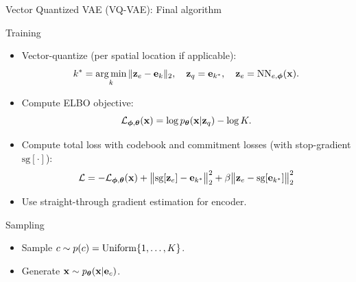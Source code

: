 \documentclass{beamer}
\begin{document}
\begin{frame}{Vector Quantized VAE (VQ-VAE): Final algorithm}
	\begin{block}{Training}
		\begin{itemize}
			\item Vector-quantize (per spatial location if applicable):
			\vspace{-0.3cm}
			\[
				k^* = \operatorname*{arg\,min}_k \|\mathbf{z}_e - \mathbf{e}_k\|_2, \quad \mathbf{z}_q = \mathbf{e}_{k^*}, \quad \mathbf{z}_e = \mathrm{NN}_{e,\boldsymbol{\phi}}(\mathbf{x}).
			\]
			\vspace{-0.5cm}
			\item Compute ELBO objective:
			\vspace{-0.3cm}
			\[
				\mathcal{L}_{\boldsymbol{\phi}, \boldsymbol{\theta}}(\mathbf{x}) = \log p_{\boldsymbol{\theta}}(\mathbf{x} | \mathbf{z}_q) - \log K.
			\]
			\vspace{-0.5cm}
			\item Compute total loss with codebook and commitment losses (with stop-gradient $\text{sg}[\cdot]$):
			\vspace{-0.3cm}
			\[
				\mathcal{L} = - \mathcal{L}_{\boldsymbol{\phi}, \boldsymbol{\theta}}(\mathbf{x}) + \big\|\text{sg}[\mathbf{z}_e] - \mathbf{e}_{k^*}\big\|_2^2 + \beta \big\|\mathbf{z}_e - \text{sg}[\mathbf{e}_{k^*}]\big\|_2^2
			\]
			\vspace{-0.5cm}
			\item Use straight-through gradient estimation for encoder.
		\end{itemize}
	\end{block}
	\eqpause
	\vspace{-0.3cm}
	\begin{block}{Sampling}
		\begin{itemize}
			\item Sample $c \sim p(c) = \operatorname{Uniform}\{1, \dots, K\}$.
			\item Generate $\mathbf{x} \sim p_{\boldsymbol{\theta}}(\mathbf{x} | \mathbf{e}_c)$.
		\end{itemize}
	\end{block}
\end{frame}
\end{document}
